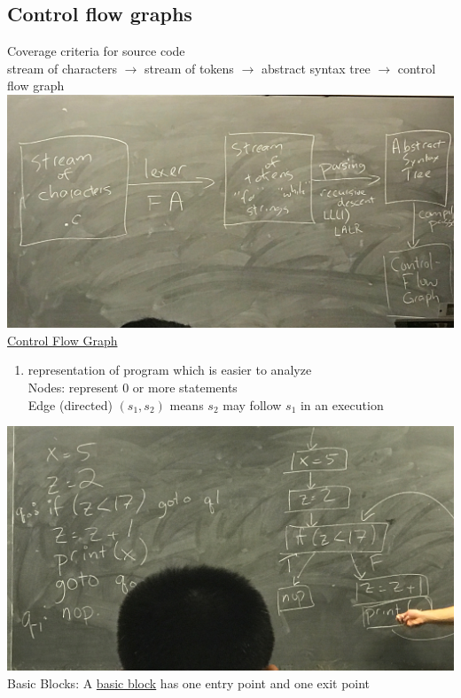 \documentclass[10pt,usletter]{article}
\newcommand{\tab}[1][1cm]{\hspace*{#1}}
\begin{document}
\subsection*{Control flow graphs}
Coverage criteria for source code\\
stream of characters $\rightarrow$ stream of tokens $\rightarrow$ abstract syntax tree $\rightarrow$ control flow graph\\
\includegraphics[scale=0.1]{control_flow_graph_1}\\
\underline{Control Flow Graph}
\begin{enumerate}
\item representation of program which is easier to analyze\\
\tab Nodes: represent 0 or more statements\\
\tab Edge (directed) $(s_1, s_2)$ means $s_2$ may follow $s_1$ in an execution
\end{enumerate}


\includegraphics[scale=0.1]{control_flow_graph_2}\\

Basic Blocks: A \underline{basic block} has one entry point and one exit point
\end{document}
